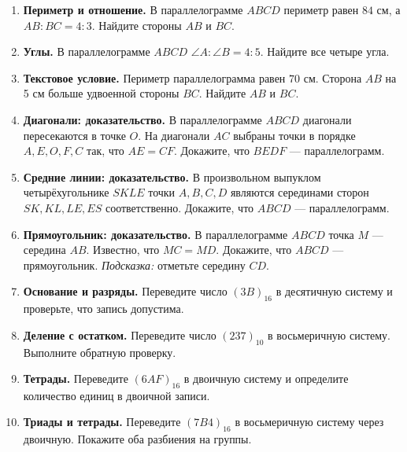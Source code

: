 \documentclass[a4paper,12pt]{article}
\newcommand{\sys}[2]{\left(#1\right)_{#2}}
\begin{document}
\begin{enumerate}[label=\textbf{\arabic*.},itemsep=11pt]
\item \textbf{Периметр и отношение.} В параллелограмме \(ABCD\) периметр равен \(84\) см, а \(AB:BC=4:3\). Найдите стороны \(AB\) и \(BC\).
\item \textbf{Углы.} В параллелограмме \(ABCD\) \(\angle A:\angle B=4:5\). Найдите все четыре угла.
\item \textbf{Текстовое условие.} Периметр параллелограмма равен \(70\) см. Сторона \(AB\) на 5 см больше удвоенной стороны \(BC\). Найдите \(AB\) и \(BC\).
\item \textbf{Диагонали: доказательство.} В параллелограмме \(ABCD\) диагонали пересекаются в точке \(O\). На диагонали \(AC\) выбраны точки в порядке \(A,E,O,F,C\) так, что \(AE=CF\). Докажите, что \(BEDF\) --- параллелограмм.
\item \textbf{Средние линии: доказательство.} В произвольном выпуклом четырёхугольнике \(SKLE\) точки \(A,B,C,D\) являются серединами сторон \(SK,KL,LE,ES\) соответственно. Докажите, что \(ABCD\) --- параллелограмм.
\item \textbf{Прямоугольник: доказательство.} В параллелограмме \(ABCD\) точка \(M\) --- середина \(AB\). Известно, что \(MC=MD\). Докажите, что \(ABCD\) --- прямоугольник. \textit{Подсказка:} отметьте середину \(CD\).
\item \textbf{Основание и разряды.} Переведите число \(\sys{3B}{16}\) в десятичную систему и проверьте, что запись допустима.
\item \textbf{Деление с остатком.} Переведите число \(\sys{237}{10}\) в восьмеричную систему. Выполните обратную проверку.
\item \textbf{Тетрады.} Переведите \(\sys{6AF}{16}\) в двоичную систему и определите количество единиц в двоичной записи.
\item \textbf{Триады и тетрады.} Переведите \(\sys{7B4}{16}\) в восьмеричную систему через двоичную. Покажите оба разбиения на группы.
\end{enumerate}

\clearpage
\end{document}
